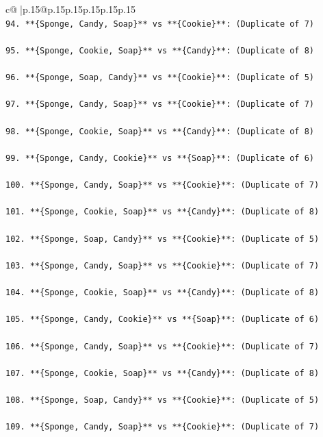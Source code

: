 \documentclass{article}
\begin{document}
{\begin{supertabular}{c@{$\;$}|p{.15\linewidth}@{}p{.15\linewidth}p{.15\linewidth}p{.15\linewidth}p{.15\linewidth}p{.15\linewidth}}
{{{\\ 
\texttt{94. **\{Sponge, Candy, Soap\}** vs **\{Cookie\}**: (Duplicate of 7)} \\
\\ 
\texttt{95. **\{Sponge, Cookie, Soap\}** vs **\{Candy\}**: (Duplicate of 8)} \\
\\ 
\texttt{96. **\{Sponge, Soap, Candy\}** vs **\{Cookie\}**: (Duplicate of 5)} \\
\\ 
\texttt{97. **\{Sponge, Candy, Soap\}** vs **\{Cookie\}**: (Duplicate of 7)} \\
\\ 
\texttt{98. **\{Sponge, Cookie, Soap\}** vs **\{Candy\}**: (Duplicate of 8)} \\
\\ 
\texttt{99. **\{Sponge, Candy, Cookie\}** vs **\{Soap\}**: (Duplicate of 6)} \\
\\ 
\texttt{100. **\{Sponge, Candy, Soap\}** vs **\{Cookie\}**: (Duplicate of 7)} \\
\\ 
\texttt{101. **\{Sponge, Cookie, Soap\}** vs **\{Candy\}**: (Duplicate of 8)} \\
\\ 
\texttt{102. **\{Sponge, Soap, Candy\}** vs **\{Cookie\}**: (Duplicate of 5)} \\
\\ 
\texttt{103. **\{Sponge, Candy, Soap\}** vs **\{Cookie\}**: (Duplicate of 7)} \\
\\ 
\texttt{104. **\{Sponge, Cookie, Soap\}** vs **\{Candy\}**: (Duplicate of 8)} \\
\\ 
\texttt{105. **\{Sponge, Candy, Cookie\}** vs **\{Soap\}**: (Duplicate of 6)} \\
\\ 
\texttt{106. **\{Sponge, Candy, Soap\}** vs **\{Cookie\}**: (Duplicate of 7)} \\
\\ 
\texttt{107. **\{Sponge, Cookie, Soap\}** vs **\{Candy\}**: (Duplicate of 8)} \\
\\ 
\texttt{108. **\{Sponge, Soap, Candy\}** vs **\{Cookie\}**: (Duplicate of 5)} \\
\\ 
\texttt{109. **\{Sponge, Candy, Soap\}** vs **\{Cookie\}**: (Duplicate of 7)} \\
}}}
\end{supertabular}}
\end{document}
